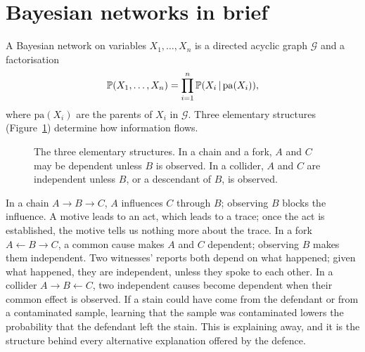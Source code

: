 \section{Bayesian networks in brief}

A Bayesian network on variables $X_1, \ldots, X_n$ is a directed acyclic graph $\mathcal{G}$ and a factorisation
\begin{equation}
\mathbb{P}(X_1,\ldots,X_n) = \prod_{i=1}^n \mathbb{P}(X_i \,\vert\, \mathrm{pa}(X_i)),
\label{eq:bnfactor}
\end{equation}
where $\mathrm{pa}(X_i)$ are the parents of $X_i$ in $\mathcal{G}$. Three elementary structures (Figure~\ref{fig:structures}) determine how information flows.

\begin{figure}[t]
\centering
{}
\caption{The three elementary structures. In a chain and a fork, $A$ and $C$ may be dependent unless $B$ is observed. In a collider, $A$ and $C$ are independent unless $B$, or a descendant of $B$, is observed.}
\label{fig:structures}
\end{figure}

In a chain $A\to B\to C$, $A$ influences $C$ through $B$; observing $B$ blocks the influence. A motive leads to an act, which leads to a trace; once the act is established, the motive tells us nothing more about the trace. In a fork $A \leftarrow B \to C$, a common cause makes $A$ and $C$ dependent; observing $B$ makes them independent. Two witnesses' reports both depend on what happened; given what happened, they are independent, unless they spoke to each other. In a collider $A \to B \leftarrow C$, two independent causes become dependent when their common effect is observed. If a stain could have come from the defendant or from a contaminated sample, learning that the sample was contaminated lowers the probability that the defendant left the stain. This is explaining away, and it is the structure behind every alternative explanation offered by the defence.

